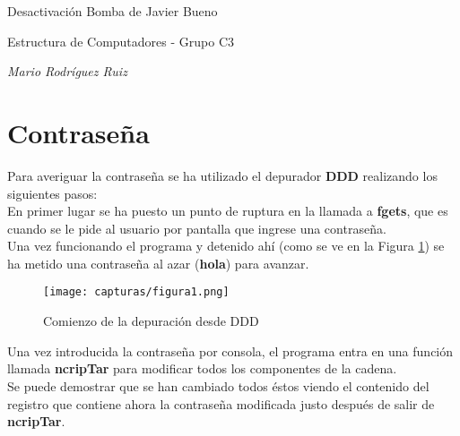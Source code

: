 





	
{\LARGE Desactivación Bomba de Javier Bueno \par}
\vspace{5mm}
{\large Estructura de Computadores - Grupo C3 \par}
\vspace{3mm}
{\large \textit{Mario Rodríguez Ruiz} \par}	
	
	

\section{Contraseña}

Para averiguar la contraseña se ha utilizado el depurador \textbf{DDD} realizando los siguientes pasos:
\\

En primer lugar se ha puesto un punto de ruptura en la llamada a \textbf{fgets}, que es cuando se le pide al usuario por pantalla que ingrese una contraseña.\\

Una vez funcionando el programa y detenido ahí (como se ve en la Figura \ref{fig:figura1}) se ha metido una contraseña al azar (\textbf{hola}) para avanzar.

\begin{figure}[H]
	\centering
	\texttt{[image: capturas/figura1.png]} 
	\caption{Comienzo de la depuración desde DDD} 
	\label{fig:figura1}
\end{figure}

Una vez introducida la contraseña por consola, el programa entra
en una función llamada \textbf{ncripTar} para modificar todos los componentes de la cadena.\\

Se puede demostrar que se han cambiado todos éstos viendo el contenido del registro que contiene ahora la contraseña modificada justo después de salir de \textbf{ncripTar}.
\\

